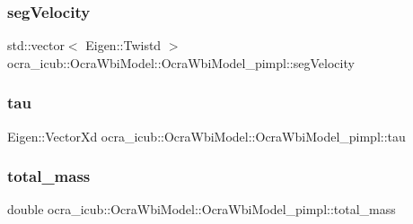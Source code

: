 \hypertarget{structOcraWbiModel_1_1OcraWbiModel__pimpl_a6e95ae9d994aa67c9a2fc4021f80bb54}{}\label{structOcraWbiModel_1_1OcraWbiModel__pimpl_a6e95ae9d994aa67c9a2fc4021f80bb54} 
\subsubsection{\texorpdfstring{seg\+Velocity}{segVelocity}}
{\footnotesize\ttfamily std\+::vector$<$ Eigen\+::\+Twistd $>$ ocra\+\_\+icub\+::\+Ocra\+Wbi\+Model\+::\+Ocra\+Wbi\+Model\+\_\+pimpl\+::seg\+Velocity}

\hypertarget{structOcraWbiModel_1_1OcraWbiModel__pimpl_a3dc9c0b3d43f7406a6b89bd2a2af5642}{}\label{structOcraWbiModel_1_1OcraWbiModel__pimpl_a3dc9c0b3d43f7406a6b89bd2a2af5642} 
\subsubsection{\texorpdfstring{tau}{tau}}
{\footnotesize\ttfamily Eigen\+::\+Vector\+Xd ocra\+\_\+icub\+::\+Ocra\+Wbi\+Model\+::\+Ocra\+Wbi\+Model\+\_\+pimpl\+::tau}

\hypertarget{structOcraWbiModel_1_1OcraWbiModel__pimpl_a992e0b522d3e3b9206f90dbcdd4727cf}{}\label{structOcraWbiModel_1_1OcraWbiModel__pimpl_a992e0b522d3e3b9206f90dbcdd4727cf} 
\subsubsection{\texorpdfstring{total\+\_\+mass}{total\_mass}}
{\footnotesize\ttfamily double ocra\+\_\+icub\+::\+Ocra\+Wbi\+Model\+::\+Ocra\+Wbi\+Model\+\_\+pimpl\+::total\+\_\+mass}

\hypertarget{structOcraWbiModel_1_1OcraWbiModel__pimpl_a7028a65d7121f197364f3e5265387771}{}\label{structOcraWbiModel_1_1OcraWbiModel__pimpl_a7028a65d7121f197364f3e5265387771} 
